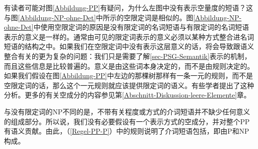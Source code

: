 有读者可能对图\ref{Abbildung-PP}有疑问，为什么左图中没有表示空量度的短语？这与图\ref{Abbildung-NP-ohne-Det}中所示的空限定词是相似的。图\ref{Abbildung-NP-ohne-Det}中使用空限定词的原因是没有限定词的名词短语与有限定词的名词短语表示的意义是一样的。通常由可见的限定词表示的意义必须以某种方式整合进名词短语的结构之中。如果我们在空限定词中没有表示这层意义的话，将会导致跟语义整合有关的更为复杂的问题：我们只是需要了解\ref{sec-PSG-Semantik}表示的机制，而且这些信息是比较普遍的。意义是由这些词本身决定的，而不是由规则决定的。如果我们假设在图\ref{Abbildung-PP}中左边的那棵树那样有一条一元的规则，而不是空限定词的话，那么这个一元规则就应该提供限定词的语义。有些学者提出了这种分析。更多的有关空成分的内容参见第\ref{Abschnitt-Diskussion-leere-Elemente}章。

与没有限定词的NP不同的是，不带有关程度或方式的介词短语并不缺少任何意义的组成部分。所以说，我们没有必要假设有一个表示方式的空成分，并对整个PP有语义贡献。由此，（\ref{Regel-PP-P}）中的规则说明了介词短语包括\pbarc，即由P和NP构成。

